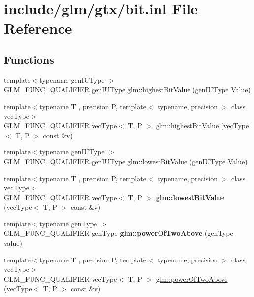 \hypertarget{bit_8inl}{}\section{include/glm/gtx/bit.inl File Reference}
\label{bit_8inl}
\subsection*{Functions}
\begin{DoxyCompactItemize}
\item 
{\footnotesize template$<$typename gen\+I\+U\+Type $>$ }\\G\+L\+M\+\_\+\+F\+U\+N\+C\+\_\+\+Q\+U\+A\+L\+I\+F\+I\+ER gen\+I\+U\+Type \hyperlink{group__gtx__bit_ga0dcc8fe7c3d3ad60dea409281efa3d05}{glm\+::highest\+Bit\+Value} (gen\+I\+U\+Type Value)
\item 
{\footnotesize template$<$typename T , precision P, template$<$ typename, precision $>$ class vec\+Type$>$ }\\G\+L\+M\+\_\+\+F\+U\+N\+C\+\_\+\+Q\+U\+A\+L\+I\+F\+I\+ER vec\+Type$<$ T, P $>$ \hyperlink{group__gtx__bit_ga5eea3a4d429040af13d39a7d7cd84d73}{glm\+::highest\+Bit\+Value} (vec\+Type$<$ T, P $>$ const \&v)
\item 
{\footnotesize template$<$typename gen\+I\+U\+Type $>$ }\\G\+L\+M\+\_\+\+F\+U\+N\+C\+\_\+\+Q\+U\+A\+L\+I\+F\+I\+ER gen\+I\+U\+Type \hyperlink{group__gtx__bit_ga2ff6568089f3a9b67f5c30918855fc6f}{glm\+::lowest\+Bit\+Value} (gen\+I\+U\+Type Value)
\item 
\mbox{\label{bit_8inl_a8356fb652bcea62e130a6526e724369f}} 
{\footnotesize template$<$typename T , precision P, template$<$ typename, precision $>$ class vec\+Type$>$ }\\G\+L\+M\+\_\+\+F\+U\+N\+C\+\_\+\+Q\+U\+A\+L\+I\+F\+I\+ER vec\+Type$<$ T, P $>$ {\bfseries glm\+::lowest\+Bit\+Value} (vec\+Type$<$ T, P $>$ const \&v)
\item 
\mbox{\label{bit_8inl_a4f29a0e902ea0e3a76fc10c5b0ef31b6}} 
{\footnotesize template$<$typename gen\+Type $>$ }\\G\+L\+M\+\_\+\+F\+U\+N\+C\+\_\+\+Q\+U\+A\+L\+I\+F\+I\+ER gen\+Type {\bfseries glm\+::power\+Of\+Two\+Above} (gen\+Type value)
\item 
{\footnotesize template$<$typename T , precision P, template$<$ typename, precision $>$ class vec\+Type$>$ }\\G\+L\+M\+\_\+\+F\+U\+N\+C\+\_\+\+Q\+U\+A\+L\+I\+F\+I\+ER vec\+Type$<$ T, P $>$ \hyperlink{group__gtx__bit_gafe08808a50226b75b50e640a08b32ddc}{glm\+::power\+Of\+Two\+Above} (vec\+Type$<$ T, P $>$ const \&v)

\end{DoxyCompactItemize}
